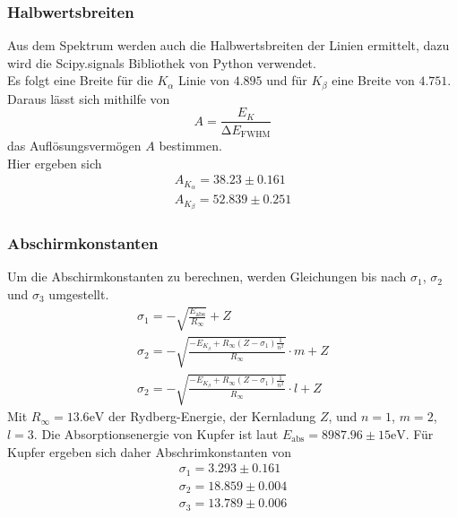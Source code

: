   \subsubsection{Halbwertsbreiten}
    Aus dem Spektrum werden auch die Halbwertsbreiten der Linien ermittelt, dazu wird die Scipy.signals Bibliothek von Python 
    verwendet. \\
    Es folgt eine Breite für die $K_{\alpha}$ Linie von $4.895$ und für $K_{\beta}$ eine Breite von $4.751$. Daraus lässt sich mithilfe von
    \begin{equation*}
      A = \frac{E_K}{\increment E_{\text{FWHM}}}
    \end{equation*}
    das Auflösungsvermögen $A$ bestimmen. \\
    Hier ergeben sich
    \begin{align*}
      A_{K_{\alpha}} = 38.23 \pm 0.161 \\
      A_{K_{\beta}} = 52.839 \pm 0.251
    \end{align*}

  \subsubsection{Abschirmkonstanten}
    Um die Abschirmkonstanten zu berechnen, werden Gleichungen bis
    nach $\sigma_1$, $\sigma_2$ und $\sigma_3$ umgestellt.\\
    \begin{align*}
      \sigma_1 = - \sqrt{\frac{E_{\text{abs}}}{R_{\infty}}} + Z\\
      \sigma_2 = - \sqrt{\frac{- E_{K_{\beta}} + R_{\infty} (Z - \sigma_1) \frac{1}{n^2}}{R_{\infty}}} \cdot m + Z\\
      \sigma_2 = - \sqrt{\frac{- E_{K_{\beta}} + R_{\infty} (Z - \sigma_1) \frac{1}{n^2}}{R_{\infty}}} \cdot l + Z
    \end{align*}
    Mit $R_{\infty} = 13.6 \text{eV}$ der Rydberg-Energie, der Kernladung $Z$, und $n = 1$, $m = 2$, $l = 3$. 
    Die Absorptionsenergie von Kupfer ist laut \cite{nist} $E_{\text{abs}} = 8987.96 \pm 15 \text{eV}$.
    Für Kupfer ergeben sich daher Abschrimkonstanten von
    \begin{align*}
      \sigma_1 = 3.293 \pm 0.161\\
      \sigma_2 = 18.859 \pm 0.004\\
      \sigma_3 = 13.789 \pm 0.006
    \end{align*}

